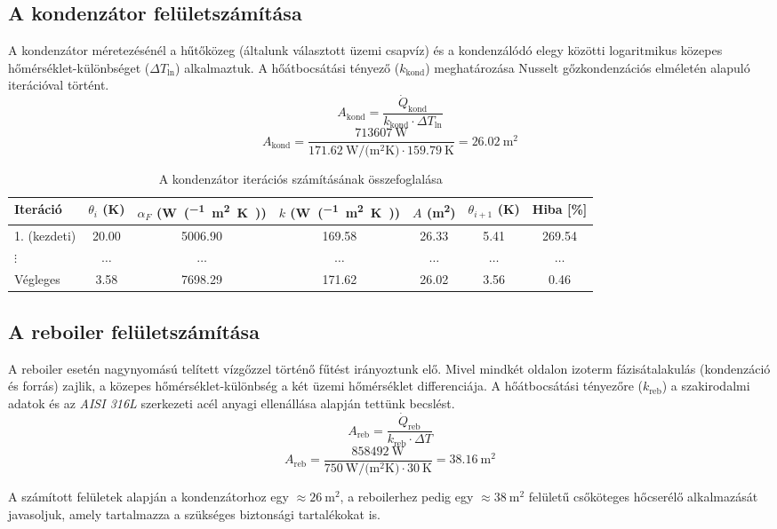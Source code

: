 \subsection{A kondenzátor felületszámítása}
A kondenzátor méretezésénél a hűtőközeg (általunk választott üzemi csapvíz) és a kondenzálódó elegy
közötti logaritmikus közepes hőmérséklet-különbséget ($\Delta
T_{\ln}$) alkalmaztuk. A hőátbocsátási tényező ($k_{\text{kond}}$)
meghatározása Nusselt gőzkondenzációs elméletén alapuló iterációval történt\autocite{VegyipariKeszulekekSzerkesztesi1986}.
\begin{equation}
  A_{\text{kond}} = \frac{\dot{Q}_{\text{kond}}}{k_{\text{kond}} \cdot \Delta T_{\ln}}
\end{equation}
\begin{equation}
  A_{\text{kond}} =
  \frac{\qty{713607}{\watt}}{\qty{171.62}{\watt\per(\square\metre\kelvin)}
  \cdot \qty{159.79}{\kelvin}} = \qty{26.02}{\square\metre}
\end{equation}

\begin{table}[h!]
\centering
\caption{A kondenzátor iterációs számításának összefoglalása}
\begin{tabular}{lcccc|cc}
\toprule
\textbf{Iteráció} & $\theta_i$ (\unit{\kelvin}) & $\alpha_F$ (\unit{\watt\per(\square\metre\kelvin)}) & $k$ (\unit{\watt\per(\square\metre\kelvin)}) & $A$ (\unit{\metre\squared}) & $\theta_{i+1}$ (\unit{\kelvin}) & Hiba [\%] \\ \midrule
1. (kezdeti) & \num{20.00} & \num{5006.90} & \num{169.58} & \num{26.33} & \num{5.41} & \num{269.54} \\
\(\vdots\) & \(\hdots\) & \(\hdots\) & \(\hdots\) & \(\hdots\) & \(\hdots\) & \(\hdots\) \\
Végleges & \num{3.58} & \num{7698.29} & \num{171.62} & \num{26.02} & \num{3.56} & \num{0.46} \\ \bottomrule
\end{tabular}
\end{table}

\subsection{A reboiler felületszámítása}
A reboiler esetén nagynyomású telített vízgőzzel történő fűtést
irányoztunk elő. Mivel mindkét oldalon izoterm fázisátalakulás
(kondenzáció és forrás) zajlik, a közepes hőmérséklet-különbség a két
üzemi hőmérséklet differenciája. A hőátbocsátási tényezőre
($k_{\text{reb}}$) a szakirodalmi adatok\autocite{sinnottCoulsonRichardsonsChemical2005} és az \emph{AISI 316L} szerkezeti acél
anyagi ellenállása alapján tettünk becslést.\autocite{VegyipariKeszulekekSzerkesztesi1986}
\begin{equation}
  A_{\text{reb}} = \frac{\dot{Q}_{\text{reb}}}{k_{\text{reb}} \cdot \Delta T}
\end{equation}
\begin{equation}
  A_{\text{reb}} =
  \frac{\qty{858492}{\watt}}{\qty{750}{\watt\per(\square\metre\kelvin)}
  \cdot \qty{30}{\kelvin}} = \qty{38.16}{\square\metre}
\end{equation}

A számított felületek alapján a kondenzátorhoz egy $\approx
\qty{26}{\square\metre}$, a reboilerhez pedig egy $\approx
\qty{38}{\square\metre}$ felületű csőköteges hőcserélő alkalmazását
javasoljuk, amely tartalmazza a szükséges biztonsági tartalékokat is.
